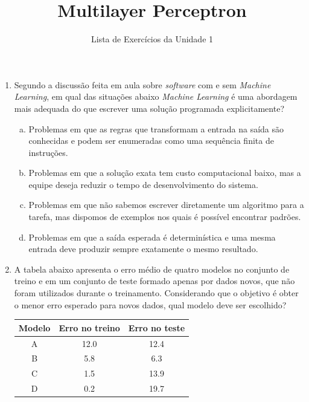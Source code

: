 \documentclass{dlproblemset}
\title{Multilayer Perceptron}
\subtitle{Lista de Exercícios da Unidade 1}
\begin{document}
\begin{enumerate}[1)]

\subsection*{Introdução a Machine Learning}

    \item Segundo a discussão feita em aula sobre \textit{software} com e sem \textit{Machine Learning}, em qual das situações abaixo \textit{Machine Learning} é uma abordagem mais adequada do que escrever uma solução programada explicitamente?
    \begin{enumerate}[(a)]
        \item Problemas em que as regras que transformam a entrada na saída são conhecidas e podem ser enumeradas como uma sequência finita de instruções.
        \item Problemas em que a solução exata tem custo computacional baixo, mas a equipe deseja reduzir o tempo de desenvolvimento do sistema.
        \item Problemas em que não sabemos escrever diretamente um algoritmo para a tarefa, mas dispomos de exemplos nos quais é possível encontrar padrões.
        \item Problemas em que a saída esperada é determinística e uma mesma entrada deve produzir sempre exatamente o mesmo resultado.
    \end{enumerate}

    \item A tabela abaixo apresenta o erro médio de quatro modelos no conjunto de treino e em um conjunto de teste formado apenas por dados novos, que não foram utilizados durante o treinamento. Considerando que o objetivo é obter o menor erro esperado para novos dados, qual modelo deve ser escolhido?

    \begin{center}
    \begin{tabular}{|c|c|c|}
        \hline
        Modelo & Erro no treino & Erro no teste \\
        \hline
        A & 12.0 & 12.4 \\
        \hline
        B & 5.8 & 6.3 \\
        \hline
        C & 1.5 & 13.9 \\
        \hline
        D & 0.2 & 19.7 \\
        \hline
    \end{tabular}
    \end{center}


\end{enumerate}
\end{document}
